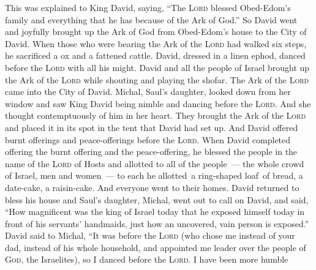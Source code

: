 \begin{inparaenum}
   This was explained to King David, saying, ``The \textsc{Lord} blessed Obed-Edom's family and everything that he has because of the Ark of God.'' So David went and joyfully brought up the Ark of God from Obed-Edom's house to the City of David.%
   When those who were bearing the Ark of the \textsc{Lord} had walked six steps, he sacrificed a ox and a fattened cattle.%
   David, dressed in a linen ephod, danced before the \textsc{Lord} with all his might.%
   David and all the people of Israel brought up the Ark of the \textsc{Lord} while shouting and playing the shofar.%
   The Ark of the \textsc{Lord} came into the City of David. Michal, Saul's daughter, looked down from her window and saw King David being nimble and dancing before the \textsc{Lord}. And she thought contemptuously of him in her heart.%
   They brought the Ark of the \textsc{Lord} and placed it in its spot in the tent that David had set up. And David offered burnt offerings and peace-offerings before the \textsc{Lord}.%
   When David completed offering the burnt offering and the peace-offering, he blessed the people in the name of the \textsc{Lord} of Hosts%
   and allotted to all of the people~--- the whole crowd of Israel, men and women~--- to each he allotted\understood\ a ring-shaped loaf\understood\ of bread, a date-cake, a raisin-cake. And everyone went to their homes.%
   David returned to bless his house and Saul's daughter, Michal, went out to call on David, and said, ``How magnificent was the king of Israel today that he exposed himself today in front of his servants' handmaids, just how an uncovered, vain person is exposed.''%
   David said to Michal, ``It was before the \textsc{Lord} (who chose me instead of your dad, instead of his whole household, and appointed me leader over the people of \textsc{God}, the Israelites), so I danced before the \textsc{Lord}.%
   I have been more humble
\end{inparaenum}
